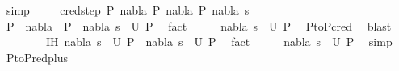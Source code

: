 \begin{isabellebody}
\ simp\ \isanewline
{}\isamarkupfalse%
\isanewline
\ \ \isamarkupfalse%
\ {\isacharparenleft}{\kern0pt}cred{\isacharunderscore}{\kern0pt}step\ P{}\ nabla{}\ P{}\ nabla{}\ P{}\ nabla{}\ s{}{\isacharparenright}{\kern0pt}\isanewline
\ \ \isamarkupfalse%
\ {\isachardoublequoteopen}P{}\ {\isasymturnstile}\ nabla{}\ {\isasymrightarrow}\ P{}{\isachardoublequoteclose}\ \ {\isachardoublequoteopen}{\isacharparenleft}{\kern0pt}nabla{}{\isacharcomma}{\kern0pt}\ s{}{\isacharparenright}{\kern0pt}\ {\isasymin}\ U\ P{}{\isachardoublequoteclose}\ \isamarkupfalse%
\ fact{\isacharplus}{\kern0pt}\isanewline
\ \ \isamarkupfalse%
\ \isamarkupfalse%
\ {\isachardoublequoteopen}{\isacharparenleft}{\kern0pt}nabla{}{\isacharcomma}{\kern0pt}\ s{}{\isacharparenright}{\kern0pt}\ {\isasymin}\ U\ P{}{\isachardoublequoteclose}\ \isamarkupfalse%
\ P{}{\isacharunderscore}{\kern0pt}to{\isacharunderscore}{\kern0pt}P{}{\isacharunderscore}{\kern0pt}cred\ \isamarkupfalse%
\ blast\ \isanewline
\ \ \isamarkupfalse%
\ \isanewline
\ \ \isamarkupfalse%
\ IH{\isacharcolon}{\kern0pt}\ {\isachardoublequoteopen}{\isacharparenleft}{\kern0pt}nabla{}{\isacharcomma}{\kern0pt}\ s{}{\isacharparenright}{\kern0pt}\ {\isasymin}\ U\ P{}\ {\isasymLongrightarrow}\ {\isacharparenleft}{\kern0pt}nabla{}{\isacharcomma}{\kern0pt}\ s{}{\isacharparenright}{\kern0pt}\ {\isasymin}\ U\ P{}{\isachardoublequoteclose}\ \isamarkupfalse%
\ fact\isanewline
\ \ \isamarkupfalse%
\ \isamarkupfalse%
\ {\isachardoublequoteopen}{\isacharparenleft}{\kern0pt}nabla{}{\isacharcomma}{\kern0pt}\ s{}{\isacharparenright}{\kern0pt}\ {\isasymin}\ U\ P{}{\isachardoublequoteclose}\ \isamarkupfalse%
\ simp\isanewline
{}\isamarkupfalse%
%
\endisatagproof
{\isafoldproof}%
%
\isadelimproof
\isanewline
%
\endisadelimproof
\isanewline
{}\isamarkupfalse%
\ P{}{\isacharunderscore}{\kern0pt}to{\isacharunderscore}{\kern0pt}P{}{\isacharunderscore}{\kern0pt}red{\isacharunderscore}{\kern0pt}plus{}{\isacharcolon}{\kern0pt}\ \isanewline

\end{isabellebody}
